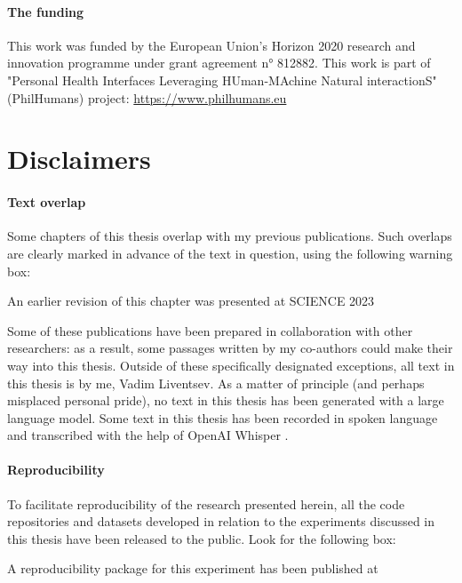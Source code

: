 \paragraph{The funding}

This work was funded by the European Union’s Horizon 2020 research and innovation programme under grant agreement n° 812882. This work is part of "Personal Health Interfaces Leveraging HUman-MAchine Natural interactionS" (PhilHumans) project: \url{https://www.philhumans.eu}

\newpage
\section{Disclaimers}

\paragraph{Text overlap}

Some chapters of this thesis overlap with my previous publications.
Such overlaps are clearly marked in advance of the text in question, using the following warning box:

\begin{remark}
    An earlier revision of this chapter \cite{liventsev2021neurogenetic} was presented at SCIENCE 2023
\end{remark}

Some of these publications have been prepared in collaboration with other researchers: as a result, some passages written by my co-authors could make their way into this thesis.
Outside of these specifically designated exceptions, all text in this thesis is by me, Vadim Liventsev.
As a matter of principle (and perhaps misplaced personal pride), no text in this thesis has been generated with a large language model.
Some text in this thesis has been recorded in spoken language and transcribed with the help of OpenAI Whisper \cite{radfordRobustSpeechRecognition2022}.

\paragraph{Reproducibility}

To facilitate reproducibility of the research presented herein, all the code repositories and datasets developed in relation to the experiments discussed in this thesis have been released to the public. Look for the following box:

\begin{remark}
    A reproducibility package for this experiment has been published at \cite{liventsevReplicationPackageFully2023}
\end{remark}

